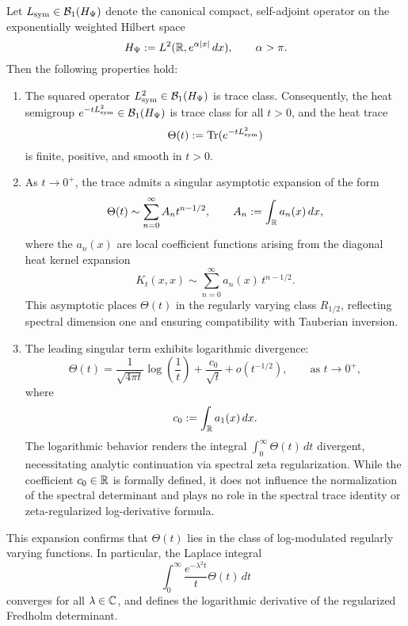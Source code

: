 \begin{lemma}
\label{lem:heat_trace_expansion}
Let \( L_{\mathrm{sym}} \in \mathcal{B}_1(H_{\Psi}) \) denote the canonical compact, self-adjoint operator on the exponentially weighted Hilbert space
\[
H_{\Psi} := L^2(\mathbb{R}, e^{\alpha|x|} \, dx), \qquad \alpha > \pi.
\]
Then the following properties hold:
\begin{enumerate}
    \item The squared operator \( L_{\mathrm{sym}}^2 \in \mathcal{B}_1(H_{\Psi}) \) is trace class. Consequently, the heat semigroup \( e^{-tL_{\mathrm{sym}}^2} \in \mathcal{B}_1(H_{\Psi}) \) is trace class for all \( t > 0 \), and the heat trace
    \[
    \Theta(t) := \operatorname{Tr}(e^{-tL_{\mathrm{sym}}^2})
    \]
    is finite, positive, and smooth in \( t > 0 \).

    \item As \( t \to 0^+ \), the trace admits a singular asymptotic expansion of the form
    \[
    \Theta(t) \sim \sum_{n=0}^{\infty} A_n t^{n - 1/2}, \qquad A_n := \int_{\mathbb{R}} a_n(x) \, dx,
    \]
    where the \( a_n(x) \) are local coefficient functions arising from the diagonal heat kernel expansion
    \[
    K_t(x,x) \sim \sum_{n=0}^{\infty} a_n(x) \, t^{n - 1/2}.
    \]
    This asymptotic places \( \Theta(t) \) in the regularly varying class \( R_{1/2} \), reflecting spectral dimension one and ensuring compatibility with Tauberian inversion.

    \item The leading singular term exhibits logarithmic divergence:
    \[
    \Theta(t) = \frac{1}{\sqrt{4\pi t}} \log\left( \frac{1}{t} \right)
    + \frac{c_0}{\sqrt{t}} + o(t^{-1/2}), \qquad \text{as } t \to 0^+,
    \]
    where
    \[
    c_0 := \int_{\mathbb{R}} a_1(x) \, dx.
    \]
    The logarithmic behavior renders the integral \( \int_0^\infty \Theta(t) \, dt \) divergent, necessitating analytic continuation via spectral zeta regularization. While the coefficient \( c_0 \in \mathbb{R} \) is formally defined, it does not influence the normalization of the spectral determinant and plays no role in the spectral trace identity or zeta-regularized log-derivative formula.
\end{enumerate}

This expansion confirms that \( \Theta(t) \) lies in the class of log-modulated regularly varying functions. In particular, the Laplace integral
\[
\int_0^\infty \frac{e^{-\lambda^2 t}}{t} \Theta(t) \, dt
\]
converges for all \( \lambda \in \mathbb{C} \), and defines the logarithmic derivative of the regularized Fredholm determinant.
\end{lemma}

